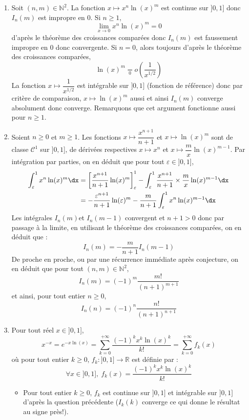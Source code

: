 \documentclass[a4paper,10pt]{report}
\begin{document}
\begin{enumerate}
\item Soit $(n,m) \in \mathbb{N}^2$. La fonction $x \mapsto x^n \ln(x)^m$ est continue sur $]0,1]$ donc $I_n(m)$ est impropre en $0$. Si $n \geq 1$, 
$$ \lim_{x \rightarrow 0} x^n \ln(x)^m =0$$
d'après le théorème des croissances comparées donc $I_n(m)$ est faussement impropre en $0$ donc convergente. Si $n=0$, alors toujours d'après le théorème des croissances comparées,
$$ \ln(x)^m \underset{0}{=} o \left( \dfrac{1}{x^{1/2}} \right)$$
La fonction $x \mapsto \dfrac{1}{x^{1/2}}$ est intégrable sur $]0,1]$ (fonction de référence) donc par critère de comparaison, $x \mapsto \ln(x)^m$ aussi et ainsi $I_n(m)$ converge absolument donc converge. Remarquons que cet argument fonctionne aussi pour $n \geq 1$.
\item Soient $n \geq 0$ et $m \geq 1$. Les fonctions $x \mapsto \dfrac{x^{n+1}}{n+1}$ et $x \mapsto \ln(x)^m$ sont de classe $\mathcal{C}^1$ sur $]0,1]$, de dérivées respectives $x \mapsto x^n$ et $x \mapsto \dfrac{m}{x} \ln(x)^{m-1}$. Par intégration par parties, on en déduit que pour tout $\varepsilon \in ]0,1]$,
\begin{align*}
\int_{\varepsilon}^1 x^n \ln(x)^m \dx & = \left[ \dfrac{x^{n+1}}{n+1} \ln(x)^m \right]_{\varepsilon}^1 - \int_{\varepsilon}^1 \dfrac{x^{n+1}}{n+1} \times \dfrac{m}{x} \ln(x)^{m-1} \dx \\
& = -\dfrac{\varepsilon^{n+1}}{n+1} \ln(\varepsilon)^m  -  \dfrac{m}{n+1} \int_{\varepsilon}^1 x^n \ln(x)^{m-1} \dx 
\end{align*}
Les intégrales $I_n(m)$et $I_n(m-1)$ convergent et $n+1>0$ donc par passage à la limite, en utilisant le théorème des croissances comparées, on en déduit que :
$$ I_n(m) = - \dfrac{m}{n+1} I_n(m-1)$$
De proche en proche, ou par une récurrence immédiate après conjecture, on en déduit que pour tout $(n,m) \in \mathbb{N}^2$,
$$ I_n(m) = (-1)^m \dfrac{m!}{(n+1)^{m+1}}$$
et ainsi, pour tout entier $n \geq 0$,
$$ I_n(n)= (-1)^n \dfrac{n!}{(n+1)^{n+1}}$$
\item Pour tout réel $x \in ]0,1]$,
$$ x^{-x} = e^{-x \ln(x)} = \sum_{k=0}^{+ \infty} \dfrac{(-1)^k x^k \ln(x)^k}{k!} = \sum_{k=0}^{+ \infty} f_k(x)$$
où pour tout entier $k \geq 0$, $f_k : ]0,1] \rightarrow \mathbb{R}$ est définie par :
$$ \forall x \in ]0,1], \; f_k(x) =  \dfrac{(-1)^k x^k \ln(x)^k}{k!}$$
\begin{itemize}
\item Pour tout entier $k \geq 0$, $f_k$ est continue sur $]0,1]$ et intégrable sur $]0,1]$ d'après la question précédente ($I_k(k)$ converge ce qui donne le résultat au signe près!).

\end{itemize}
\end{enumerate}
\end{document}
